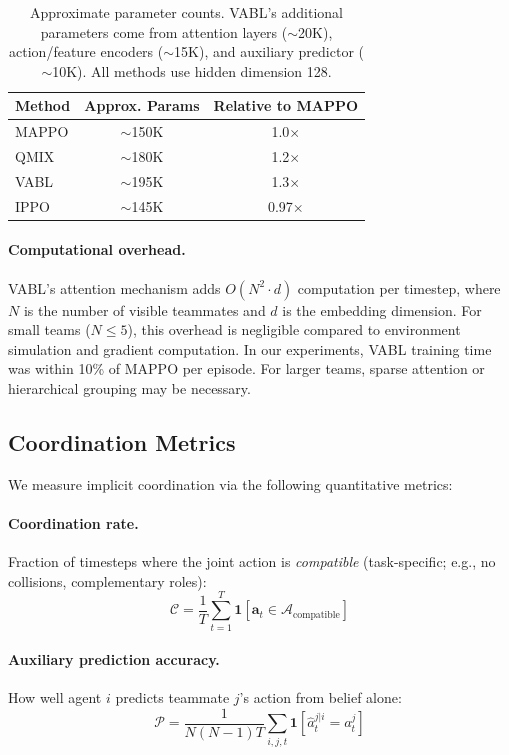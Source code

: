 \documentclass{article}
\theoremstyle{plain}
\theoremstyle{definition}
\theoremstyle{remark}
\begin{document}
\begin{table}[h]
\centering
\begin{tabular}{lcc}
\toprule
\textbf{Method} & \textbf{Approx. Params} & \textbf{Relative to MAPPO} \\
\midrule
MAPPO & $\sim$150K & 1.0$\times$ \\
QMIX & $\sim$180K & 1.2$\times$ \\
VABL & $\sim$195K & 1.3$\times$ \\
IPPO & $\sim$145K & 0.97$\times$ \\
\bottomrule
\end{tabular}
\caption{Approximate parameter counts. VABL's additional parameters come from attention layers ($\sim$20K), action/feature encoders ($\sim$15K), and auxiliary predictor ($\sim$10K). All methods use hidden dimension 128.}
\label{tab:param_counts}
\end{table}

\paragraph{Computational overhead.}
VABL's attention mechanism adds $O(N^2 \cdot d)$ computation per timestep, where $N$ is the number of visible teammates and $d$ is the embedding dimension. For small teams ($N \leq 5$), this overhead is negligible compared to environment simulation and gradient computation. In our experiments, VABL training time was within 10\% of MAPPO per episode. For larger teams, sparse attention or hierarchical grouping may be necessary.


\subsection{Coordination Metrics}
\label{app:metrics}

We measure implicit coordination via the following quantitative metrics:

\paragraph{Coordination rate.} Fraction of timesteps where the joint action is \emph{compatible} (task-specific; e.g., no collisions, complementary roles):
\begin{equation}
\mathcal{C} = \frac{1}{T}\sum_{t=1}^T \mathbf{1}[\mathbf{a}_t \in \mathcal{A}_{\mathrm{compatible}}]
\end{equation}

\paragraph{Auxiliary prediction accuracy.} How well agent $i$ predicts teammate $j$'s action from belief alone:
\begin{equation}
\mathcal{P} = \frac{1}{N(N-1)T}\sum_{i,j,t} \mathbf{1}[\hat{a}_{t}^{j|i} = a_t^j]
\end{equation}
\end{document}
